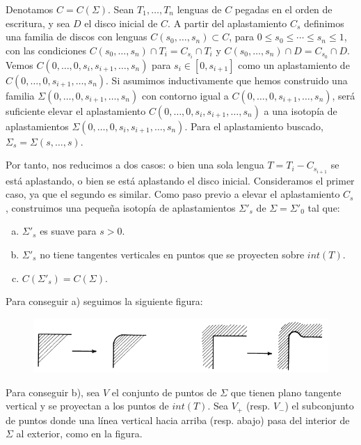 \documentclass[twoside, 11pt]{article}
\begin{document}
\begin{dem}
Denotamos $C=C(\Sigma)$. Sean $T_1,\dots, T_n$ lenguas de $C$ pegadas en el orden de escritura, y sea $D$ el disco inicial de $C$. A partir del aplastamiento $C_s$ definimos una familia de discos con lenguas $C(s_0,\dots, s_n)\subset C$, para $0\leq s_0\leq\cdots\leq s_n\leq 1$, con las condiciones $C(s_0,\dots, s_n)\cap T_i=C_{s_i}\cap T_i$ y $C(s_0,\dots, s_n)\cap D=C_{s_0}\cap D$. Vemos $C(0,\dots, 0,s_i,s_{i+1},\dots, s_n)$ para $s_i\in[0,s_{i+1}]$ como un aplastamiento de $C(0,\dots, 0,s_{i+1},\dots, s_n)$. Si asumimos inductivamente que hemos construido una familia $\Sigma(0,\dots, 0, s_{i+1},\dots, s_n)$ con contorno igual a $C(0,\dots, 0,s_{i+1},\dots, s_n)$, será suficiente elevar el aplastamiento $C(0,\dots, 0,s_i,s_{i+1},\dots, s_n)$ a una isotopía de aplastamientos $\Sigma(0,\dots, 0, s_i, s_{i+1},\dots, s_n)$. Para el aplastamiento buscado, $\Sigma_s=\Sigma(s,\dots, s)$. 

Por tanto, nos reducimos a dos casos: o bien una sola lengua $T=T_i-C_{s_{i+1}}$ se está aplastando, o bien se está aplastando el disco inicial. Consideramos el primer caso, ya que el segundo es similar. Como paso previo a elevar el aplastamiento $C_s$, construimos una pequeña isotopía de aplastamientos $\Sigma'_s$ de $\Sigma=\Sigma'_0$ tal que:
\begin{enumerate}[a)]
\item $\Sigma'_s$ es suave para $s>0$. 
\item $\Sigma'_s$ no tiene tangentes verticales en puntos que se proyecten sobre $int(T)$. 
\item $C(\Sigma'_s)=C(\Sigma)$. 
\end{enumerate}
Para conseguir a) seguimos la siguiente figura:

\vspace{0.5cm}




\begin{figure}[h!]
\includegraphics[scale=0.7]{(a)}
\end{figure}
Para conseguir b), sea $V$ el conjunto de puntos de $\Sigma$ que tienen plano tangente vertical y se proyectan a los puntos de $int(T)$. Sea $V_+$ (resp. $V_-$) el subconjunto de puntos donde una línea vertical hacia arriba (resp. abajo) pasa del interior de $\Sigma$ al exterior, como en la figura.


\end{dem}
\end{document}
